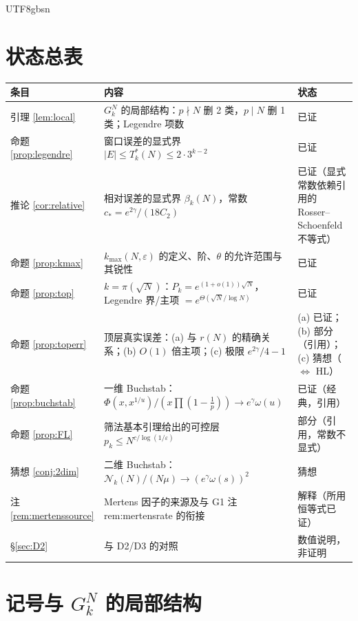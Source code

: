\documentclass[11pt,a4paper]{article}
\newcommand{\Haar}{\mu}
\newcommand{\Cnt}{\mathcal N}          %
\newcommand{\Tmix}{T^{*}}               %
\newcommand{\kmax}{k_{\max}}
\theoremstyle{plain}
\theoremstyle{definition}
\begin{document}
\begin{CJK}{UTF8}{gbsn}
\section*{状态总表}
\begin{center}
\begin{tabular}{p{2.6cm}p{7.6cm}p{4.2cm}}
\hline
条目 & 内容 & 状态\\
\hline
引理 \ref{lem:local} & $G_k^N$ 的局部结构：$p\nmid N$ 删 2 类，$p\mid N$ 删 1 类；Legendre 项数 & 已证\\
命题 \ref{prop:legendre} & 窗口误差的显式界 $|E|\le\Tmix_k(N)\le2\cdot3^{k-2}$ & 已证\\
推论 \ref{cor:relative} & 相对误差的显式界 $\beta_k(N)$，常数 $c_*=e^{2\gamma}/(18C_2)$ & 已证（显式常数依赖引用的 Rosser--Schoenfeld 不等式）\\
命题 \ref{prop:kmax} & $\kmax(N,\varepsilon)$ 的定义、阶、$\theta$ 的允许范围与其锐性 & 已证\\
命题 \ref{prop:top} & $k=\pi(\sqrt N)$：$P_k=e^{(1+o(1))\sqrt N}$，Legendre 界/主项 $=e^{\Theta(\sqrt N/\log N)}$ & 已证\\
命题 \ref{prop:toperr} & 顶层真实误差：(a) 与 $r(N)$ 的精确关系；(b) $O(1)$ 倍主项；(c) 极限 $e^{2\gamma}/4-1$ & (a) 已证；(b) 部分（引用）；(c) 猜想（$\Leftrightarrow$ HL）\\
命题 \ref{prop:buchstab} & 一维 Buchstab：$\Phi(x,x^{1/u})/(x\prod(1-\frac1p))\to e^\gamma\omega(u)$ & 已证（经典，引用）\\
命题 \ref{prop:FL} & 筛法基本引理给出的可控层 $p_k\le N^{c/\log(1/\varepsilon)}$ & 部分（引用，常数不显式）\\
猜想 \ref{conj:2dim} & 二维 Buchstab：$\Cnt_k(N)/(N\Haar)\to(e^\gamma\omega(s))^2$ & 猜想\\
注 \ref{rem:mertenssource} & Mertens 因子的来源及与 G1 注 rem:mertensrate 的衔接 & 解释（所用恒等式已证）\\
\S\ref{sec:D2} & 与 D2/D3 的对照 & 数值说明，非证明\\
\hline
\end{tabular}
\end{center}

\section{记号与 $G_k^N$ 的局部结构}\label{sec:notation}


\end{CJK}
\end{document}
